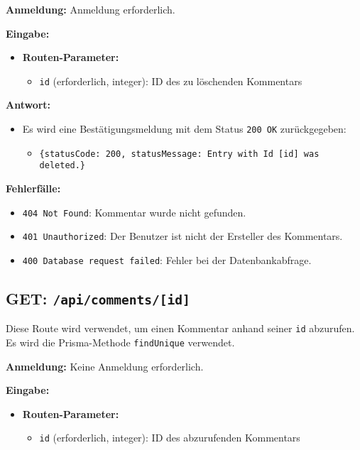 \documentclass[a4paper,12pt]{article}
\begin{document}
\textbf{Anmeldung:} Anmeldung erforderlich.

\textbf{Eingabe:}
\begin{itemize}
    \item \textbf{Routen-Parameter:}
    \begin{itemize}
        \item \texttt{id} (erforderlich, integer):
            ID des zu löschenden Kommentars
    \end{itemize}
\end{itemize}

\textbf{Antwort:}
\begin{itemize}
    \item Es wird eine Bestätigungsmeldung mit dem Status
        \texttt{200 OK} zurückgegeben:
    \begin{itemize}
        \item \texttt{\{statusCode: 200,
            statusMessage: Entry with Id [id] was deleted.\}}
    \end{itemize}
\end{itemize}

\textbf{Fehlerfälle:}
\begin{itemize}
    \item \texttt{404 Not Found}:
        Kommentar wurde nicht gefunden.
    \item \texttt{401 Unauthorized}:
        Der Benutzer ist nicht der Ersteller des Kommentars.
    \item \texttt{400 Database request failed}:
        Fehler bei der Datenbankabfrage.
\end{itemize}

\subsection{GET: \texttt{/api/comments/[id]}}

Diese Route wird verwendet, um einen Kommentar anhand seiner \texttt{id}
abzurufen. Es wird die Prisma-Methode \texttt{findUnique} verwendet.

\textbf{Anmeldung:} Keine Anmeldung erforderlich.

\textbf{Eingabe:}
\begin{itemize}
    \item \textbf{Routen-Parameter:}
    \begin{itemize}
        \item \texttt{id} (erforderlich, integer):
            ID des abzurufenden Kommentars
    \end{itemize}
\end{itemize}
\end{document}
